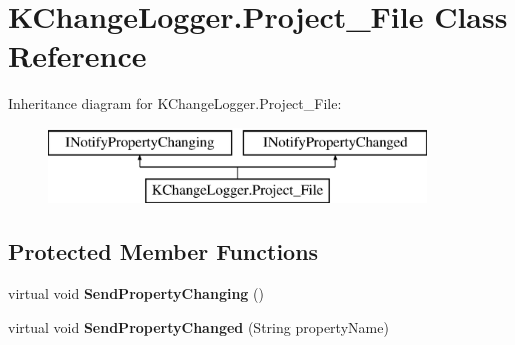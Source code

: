 \hypertarget{class_k_change_logger_1_1_project___file}{\section{K\-Change\-Logger.\-Project\-\_\-\-File Class Reference}
\label{class_k_change_logger_1_1_project___file}
}
Inheritance diagram for K\-Change\-Logger.\-Project\-\_\-\-File\-:\begin{figure}[H]
\begin{center}
\leavevmode
\includegraphics[height=2.000000cm]{class_k_change_logger_1_1_project___file}
\end{center}
\end{figure}
\subsection*{Protected Member Functions}
\begin{DoxyCompactItemize}
\item 
\hypertarget{class_k_change_logger_1_1_project___file_a734dd33ced084d39132b36977f239ce3}{virtual void {\bfseries Send\-Property\-Changing} ()}\label{class_k_change_logger_1_1_project___file_a734dd33ced084d39132b36977f239ce3}

\item 
\hypertarget{class_k_change_logger_1_1_project___file_a09b9335dbf406dece18804ca49d59ea2}{virtual void {\bfseries Send\-Property\-Changed} (String property\-Name)}\label{class_k_change_logger_1_1_project___file_a09b9335dbf406dece18804ca49d59ea2}

\end{DoxyCompactItemize}
